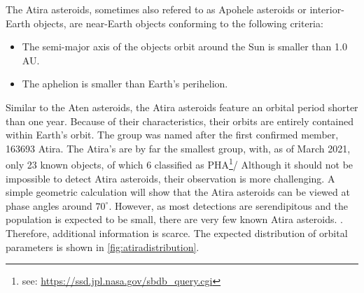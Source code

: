 The Atira asteroids, sometimes also refered to as Apohele asteroids or interior-Earth objects, are near-Earth objects conforming to the following criteria:
\begin{itemize}
    \item The semi-major axis of the objects orbit around the Sun is smaller than 1.0 AU.
    \item The aphelion is smaller than Earth's perihelion.
\end{itemize}

Similar to the Aten asteroids, the Atira asteroids feature an orbital period shorter than one year. Because of their characteristics, their orbits are entirely contained within Earth's orbit. The group was named after the first confirmed member, 163693 Atira. The Atira's are by far the smallest group, with, as of March 2021, only 23 known objects, of which 6 classified as PHA\footnote{see: \url{https://ssd.jpl.nasa.gov/sbdb_query.cgi}}/ Although it should not be impossible to detect Atira asteroids, their observation is more challenging. A simple geometric calculation will show that the Atira asteroids can be viewed at phase angles around $70^\circ$. However, as most detections are serendipitous and the population is expected to be small, there are very few known Atira asteroids. \cite{debiased}. Therefore, additional information is scarce. The expected distribution of orbital parameters is shown in \autoref{fig:atiradistribution}.